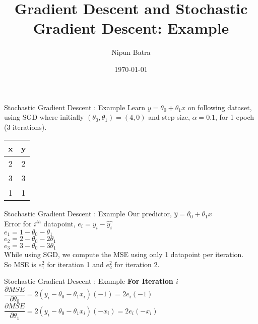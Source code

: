 \documentclass{beamer}
\title{Gradient Descent and Stochastic Gradient Descent: Example}
\date{\today}
\author{Nipun Batra}
\institute{IIT Gandhinagar}
\begin{document}
	\maketitle


	\begin{frame}{Stochastic Gradient Descent : Example}
		Learn $y = \theta_0 + \theta_1 x$ on following dataset, using SGD where initially $(\theta_0, \theta_1) = (4,0)$ and step-size, $\alpha  = 0.1$, for 1 epoch (3 iterations). 
		\begin{table}[]
		\centering
		\label{tab:my-table}
		\begin{tabular}{|c|c|}
		\hline
		\textbf{x} & \textbf{y} \\ \hline
		2 & 2 \\ \hline
		3 & 3 \\ \hline
		1 & 1 \\ \hline
		\end{tabular}
		\end{table}
	\end{frame}

	\begin{frame}{Stochastic Gradient Descent : Example}
		Our predictor, $\hat{y} = \theta_0 + \theta_1x$\\
		\vspace{1cm}
		Error for $i^{th}$ datapoint, $e_i = y_i - \hat{y_i}$\\
		$e_1 = 1 - \theta_0 - \theta_1$ \\
		$e_2 = 2 - \theta_0 - 2\theta_1$ \\
		$e_3 = 3 - \theta_0 - 3\theta_1$ \\
		
		\vspace{1cm}
		While using SGD, we compute the MSE using only 1 datapoint per iteration. \\
		So MSE is $e_1^2$ for iteration 1 and $e_2^2$ for iteration 2.
	\end{frame}


	\begin{frame}{Stochastic Gradient Descent : Example}
		\textbf{For Iteration $i$}\\
		\vspace{1cm}
		$\dfrac{\partial MSE}{\partial \theta_0} = 2\left( y_i - \theta_0 -\theta_1x_i \right)\left(-1\right) = 2e_i\left(-1\right)$ \\
		\vspace{2cm}
		$\dfrac{\partial MSE}{\partial \theta_1} = 2\left( y_i - \theta_0 -\theta_1x_i \right)\left(-x_i\right) = 2e_i\left(-x_i\right)$ 
	\end{frame}
\end{document}
